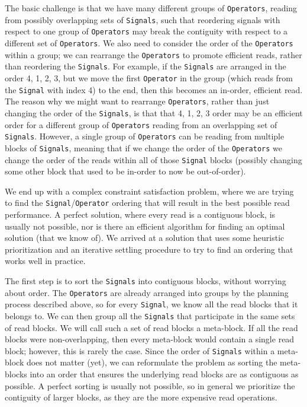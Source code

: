 \documentclass{article}
\begin{document}
The basic challenge is that we have many different groups of \texttt{Operators}, reading from possibly overlapping sets of \texttt{Signals}, such that reordering signals with respect to one group of \texttt{Operators} may break the contiguity with respect to a different set of \texttt{Operators}.  We also need to consider the order of the \texttt{Operators} within a group; we can rearrange the \texttt{Operators} to promote efficient reads, rather than reordering the \texttt{Signals}.  For example, if the \texttt{Signals} are arranged in the order 4, 1, 2, 3, but we move the first \texttt{Operator} in the group (which reads from the \texttt{Signal} with index 4) to the end, then this becomes an in-order, efficient read.  The reason why we might want to rearrange \texttt{Operators}, rather than just changing the order of the \texttt{Signals}, is that that 4, 1, 2, 3 order may be an efficient order for a different group of \texttt{Operators} reading from an overlapping set of \texttt{Signals}.  However, a single group of \texttt{Operators} can be reading from multiple blocks of \texttt{Signals}, meaning that if we change the order of the \texttt{Operators} we change the order of the reads within all of those \texttt{Signal} blocks (possibly changing some other block that used to be in-order to now be out-of-order).

We end up with a complex constraint satisfaction problem, where we are trying to find the \texttt{Signal}/\texttt{Operator} ordering that will result in the best possible read performance. A perfect solution, where every read is a contiguous block, is usually not possible, nor is there an efficient algorithm for finding an optimal solution (that we know of).  We arrived at a solution that uses some heuristic prioritization and an iterative settling procedure to try to find an ordering that works well in practice.  

The first step is to sort the \texttt{Signals} into contiguous blocks, without worrying about order.  The \texttt{Operators} are already arranged into groups by the planning process described above, so for every \texttt{Signal}, we know all the read blocks that it belongs to.  We can then group all the \texttt{Signals} that participate in the same sets of read blocks.  We will call such a set of read blocks a meta-block.  If all the read blocks were non-overlapping, then every meta-block would contain a single read block; however, this is rarely the case.  Since the order of \texttt{Signals} within a meta-block does not matter (yet), we can reformulate the problem as sorting the meta-blocks into an order that ensures the underlying read blocks are as contiguous as possible.  A perfect sorting is usually not possible, so in general we prioritize the contiguity of larger blocks, as they are the more expensive read operations.
\end{document}
